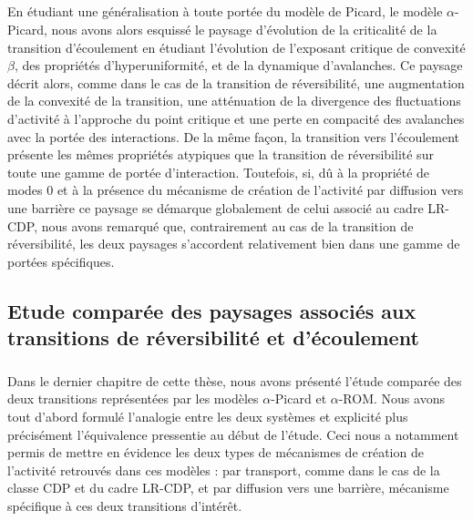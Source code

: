 \subparagraph{}En étudiant une généralisation à toute portée du modèle de Picard, le modèle $\alpha$-Picard, nous avons alors esquissé le paysage d'évolution de la criticalité de la transition d'écoulement en étudiant l'évolution de l'exposant critique de convexité $\beta$, des propriétés d'hyperuniformité, et de la dynamique d'avalanches. Ce paysage décrit alors, comme dans le cas de la transition de réversibilité, une augmentation de la convexité de la transition, une atténuation de la divergence des fluctuations d'activité à l'approche du point critique et une perte en compacité des avalanches avec la portée des interactions. De la même façon, la transition vers l'écoulement présente les mêmes propriétés atypiques que la transition de réversibilité sur toute une gamme de portée d'interaction.  Toutefois, si, dû à la propriété de modes 0 et à la présence du mécanisme de création de l'activité par diffusion vers une barrière ce paysage se démarque globalement de celui associé au cadre LR-CDP, nous avons remarqué que, contrairement au cas de la transition de réversibilité, les deux paysages s'accordent relativement bien dans une gamme de portées spécifiques.

\subsection*{Etude comparée des paysages associés aux transitions de réversibilité et d'écoulement}

\subparagraph{}Dans le dernier chapitre de cette thèse, nous avons présenté l'étude comparée des deux transitions représentées par les modèles $\alpha$-Picard et $\alpha$-ROM. Nous avons tout d'abord formulé l'analogie entre les deux systèmes et explicité plus précisément l'équivalence pressentie au début de l'étude. Ceci nous a notamment permis de mettre en évidence les deux types de mécanismes de création de l'activité retrouvés dans ces modèles : par transport, comme dans le cas de la classe CDP et du cadre LR-CDP, et par diffusion vers une barrière, mécanisme spécifique à ces deux transitions d'intérêt.

